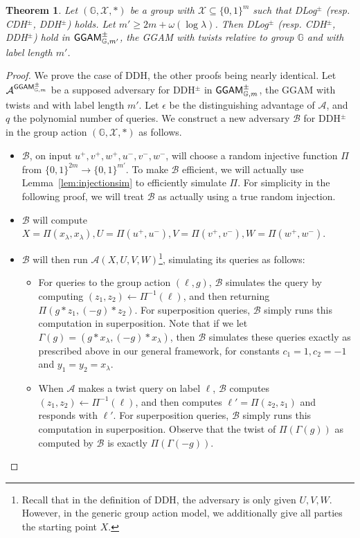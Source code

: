 \documentclass{article}\usepackage[a4paper,margin=20mm]{geometry}
\newtheorem{theorem}{Theorem}\newtheorem{lemma}[theorem]{Lemma}\newtheorem{proposition}[theorem]{Proposition}\newtheorem{corollary}[theorem]{Corollary}\newtheorem{definition}[theorem]{Definition}\newtheorem{claim}[theorem]{Claim}\newtheorem{remark}[theorem]{Remark}\newtheorem{observation}[theorem]{Observation}\newtheorem{conjecture}[theorem]{Conjecture}\newtheorem{example}[theorem]{Example}
\numberwithin{theorem}{section}
\numberwithin{equation}{section}
\newcommand{\G}{\mathbb{G}}
\newcommand{\As}{{\mathcal{A}}}
\newcommand{\Bs}{{\mathcal{B}}}
\newcommand{\Xs}{{\mathcal{X}}}
\newcommand{\GGAM}{{\sf GGAM}}
\begin{document}
\begin{theorem}Let $(\G,\Xs,*)$ be a group with $\Xs\subseteq\{0,1\}^m$ such that DLog$^\pm$ (resp. CDH$^\pm$, DDH$^\pm$) holds. Let $m'\geq 2m+\omega(\log\lambda)$. Then DLog$^\pm$ (resp. CDH$^\pm$, DDH$^\pm$) hold in $\GGAM^{\pm}_{\G,m'}$, the GGAM with twists relative to group $\G$ and with label length $m'$.\end{theorem}
\begin{proof}We prove the case of DDH, the other proofs being nearly identical. Let $\As^{\GGAM^\pm_{\G,m}}$ be a supposed adversary for DDH$^\pm$ in $\GGAM^\pm_{\G,m}$, the GGAM with twists and with label length $m'$. Let $\epsilon$ be the distinguishing advantage of $\As$, and $q$ the polynomial number of queries. We construct a new adversary $\Bs$ for DDH$^\pm$ in the group action $(\G,\Xs,*)$ as follows.
	\begin{itemize}
		\item $\Bs$, on input $u^+,v^+,w^+,u^-,v^-,w^-$, will choose a random injective function $\Pi$ from $\{0,1\}^{2m}\rightarrow\{0,1\}^{m'}$. To make $\Bs$ efficient, we will actually use Lemma~\ref{lem:injectionsim} to efficiently simulate $\Pi$. For simplicity in the following proof, we will treat $\Bs$ as actually using a true random injection.
		\item $\Bs$ will compute $X=\Pi(x_\lambda,x_\lambda),U=\Pi(u^+,u^-),V=\Pi(v^+,v^-),W=\Pi(w^+,w^-)$.
		\item $\Bs$ will then run $\As(X,U,V,W)$\enspace\footnote{Recall that in the definition of DDH, the adversary is only given $U,V,W$. However, in the generic group action model, we additionally give all parties the starting point $X$.}, simulating its queries as follows:
		\begin{itemize}
			\item For queries to the group action $(\ell,g)$, $\Bs$ simulates the query by computing $(z_1,z_2)\gets\Pi^{-1}(\ell)$, and then returning $\Pi(g*z_1,(-g)*z_2)$. For superposition queries, $\Bs$ simply runs this computation in superposition. Note that if we let $\Gamma(g)=(g*x_\lambda,(-g)*x_\lambda)$, then $\Bs$ simulates these queries exactly as prescribed  above in our general framework, for constants $c_1=1,c_2=-1$ and $y_1=y_2=x_\lambda$.
			
			\item When $\As$ makes a twist query on label $\ell$, $\Bs$ computes $(z_1,z_2)\gets\Pi^{-1}(\ell)$, and then computes $\ell'=\Pi(z_2,z_1)$ and responds with $\ell'$. For superposition queries, $\Bs$ simply runs this computation in superposition. Observe that the twist of $\Pi(\Gamma(g))$ as computed by $\Bs$ is exactly $\Pi(\Gamma(-g))$.
		\end{itemize}
		

\end{itemize}
\end{proof}
\end{document}
